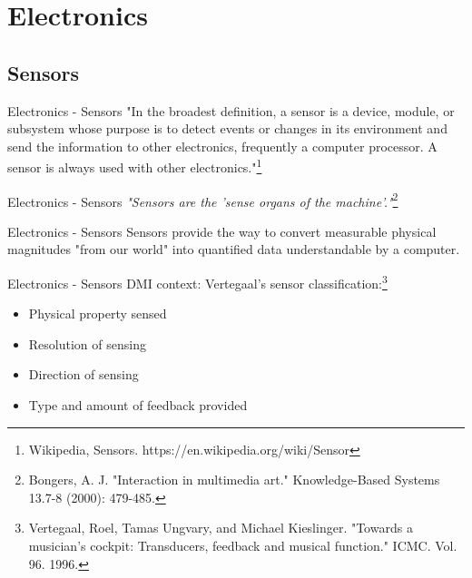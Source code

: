 \documentclass{beamer}
\begin{document}
\section{Electronics}

\subsection{Sensors}

\begin{frame}{Electronics - Sensors}
    "In the broadest definition, a sensor is a device, module, or subsystem whose purpose is to detect events or changes in its environment and send the information to other electronics, frequently a computer processor. A sensor is always used with other electronics."\footnote{Wikipedia, Sensors. https://en.wikipedia.org/wiki/Sensor}
\end{frame}

\begin{frame}{Electronics - Sensors}
    \textit{"Sensors are the 'sense organs of the machine'."}\footnote{Bongers, A. J. "Interaction in multimedia art." Knowledge-Based Systems 13.7-8 (2000): 479-485.}
\end{frame}

\begin{frame}{Electronics - Sensors}
    Sensors provide the way to convert measurable physical magnitudes "from our world" into quantified data understandable by a computer.
\end{frame}

\begin{frame}{Electronics - Sensors}
    DMI context: Vertegaal's sensor classification:\footnote{Vertegaal, Roel, Tamas Ungvary, and Michael Kieslinger. "Towards a musician's cockpit: Transducers, feedback and musical function." ICMC. Vol. 96. 1996.}
    \begin{itemize}
        \item Physical property sensed
        \item Resolution of sensing
        \item Direction of sensing
        \item Type and amount of feedback provided
    \end{itemize}
\end{frame}
\end{document}
